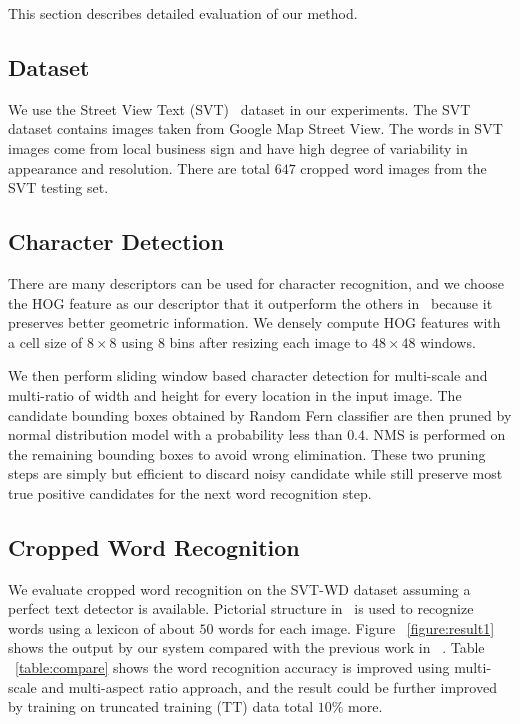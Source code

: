 \documentclass[10pt,twocolumn,letterpaper]{article}
\begin{document}
This section describes detailed evaluation of our method.

\subsection{Dataset}

We use the Street View Text (SVT)~\cite{417} dataset in our experiments. The SVT dataset contains images taken from Google Map Street View. The words in SVT images come from local business sign and have high degree of variability in appearance and resolution. There are total $647$ cropped word images from the SVT testing set.

\subsection{Character Detection}

There are many descriptors can be used for character recognition, and we choose the HOG feature as our descriptor that it outperform the others in~\cite{117} because it preserves better geometric information. We densely compute HOG features with a cell size of $8 \times 8$ using $8$ bins after resizing each image to $48 \times 48$ windows.

We then perform sliding window based character detection for multi-scale and multi-ratio of width and height for every location in the input image. The candidate bounding boxes obtained by Random Fern classifier are then pruned by normal distribution model with a probability less than $0.4$. NMS is performed on the remaining bounding boxes to avoid wrong elimination. These two pruning steps are simply but efficient to discard noisy candidate while still preserve most true positive candidates for the next word recognition step.

\subsection{Cropped Word Recognition}

We evaluate cropped word recognition on the SVT-WD dataset assuming a perfect text detector is available. Pictorial structure in~\cite{417} is used to recognize words using a lexicon of about $50$ words for each image. Figure ~\ref{figure:result1} shows the output by our system compared with the previous work in ~\cite{417}. Table ~\ref{table:compare} shows the word recognition accuracy is improved using multi-scale and multi-aspect ratio approach, and the result could be further improved by training on truncated training (TT) data total $10\%$ more.
\end{document}
